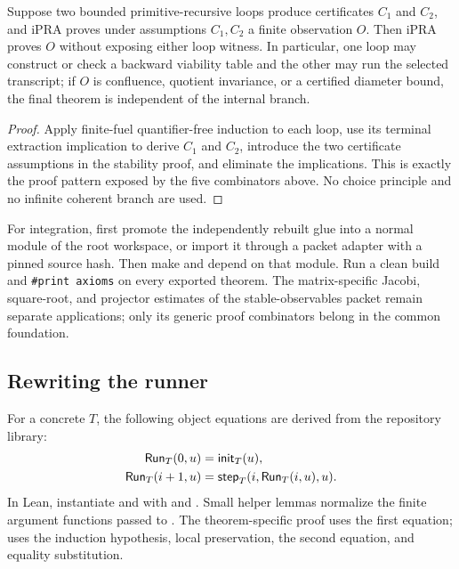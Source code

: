 \begin{proposition}
\label{prop:finite-use-observable-fusion}
Suppose two bounded primitive-recursive loops produce certificates $C_1$ and
$C_2$, and iPRA proves under assumptions $C_1,C_2$ a finite observation $O$.
Then iPRA proves $O$ without exposing either loop witness.  In particular, one
loop may construct or check a backward viability table and the other may run
the selected transcript; if $O$ is confluence, quotient invariance, or a
certified diameter bound, the final theorem is independent of the internal
branch.
\end{proposition}

\begin{proof}
Apply finite-fuel quantifier-free induction to each loop, use its terminal
extraction implication to derive $C_1$ and $C_2$, introduce the two certificate
assumptions in the stability proof, and eliminate the implications.  This is
exactly the proof pattern exposed by the five combinators above.  No choice
principle and no infinite coherent branch are used.
\end{proof}

For integration, first promote the independently rebuilt glue into a normal
module of the root  workspace, or import it through a packet
adapter with a pinned source hash.  Then make 
and  depend on that module.  Run a clean build and
\texttt{\#print axioms} on every exported theorem.  The matrix-specific Jacobi,
square-root, and projector estimates of the stable-observables packet remain
separate applications; only its generic proof combinators belong in the common
foundation.

\subsection{Rewriting the runner}

For a concrete $T$, the following object equations are derived from the repository library:
\begin{align*}
 \mathsf{Run}_T(0,u)&=\mathsf{init}_T(u),\\
 \mathsf{Run}_T(i+1,u)&=\mathsf{step}_T(i,\mathsf{Run}_T(i,u),u).
\end{align*}
In Lean, instantiate  and  with  and .  Small helper lemmas normalize the finite argument functions passed to .  The theorem-specific  proof uses the first equation;  uses the induction hypothesis, local preservation, the second equation, and equality substitution.

